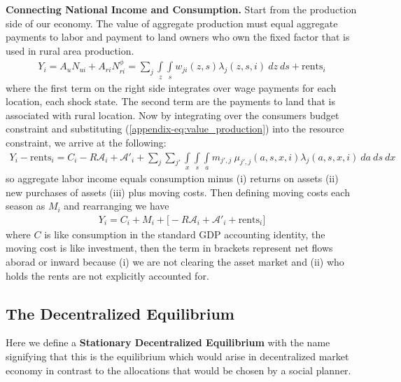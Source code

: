 \documentclass[12pt,pdftex]{article}
\begin{document}
\textbf{Connecting National Income and Consumption.} Start from the production side of our economy. The value of aggregate production must equal aggregate payments to labor and payment to land owners who own the fixed factor that is used in rural area production.
\begin{align}
Y_i = A_u N_{ui} + A_{ri}N_{ri}^{\phi} = \sum_{j} \int\limits_{z} \int\limits_{s} w_{ji}(z, s)\lambda_j(z, s,i)\ dz \ ds + \mbox{rents}_{i}
\label{appendix-eq:value_production}
\end{align}
where the first term on the right side integrates over wage payments for each location, each shock state. The second term are the payments to land that is associated with rural location. Now by integrating over the consumers budget constraint and substituting (\ref{appendix-eq:value_production}) into the resource constraint, we arrive at the following:
\begin{align}
Y_i - \mbox{rents}_{i} = C_i - R\mathcal{A}_i +  \mathcal{A'}_i  + \sum_{j}\sum_{j'} \int\limits_{x} \int\limits_{s} \int\limits_{a} m_{j',j} \ \mu_{j',j}(a, s, x, i) \lambda_j(a, s, x, i) \ da \ ds \ dx
\label{appendix-eq:expenditure_side_gdp}
\end{align}
so aggregate labor income equals consumption minus (i) returns on assets (ii) new purchases of assets (iii) plus moving costs. Then defining moving costs each season as $M_i$ and rearranging we have
\begin{align}
Y_i = C_i  + M_i + \bigg[-R\mathcal{A}_i +  \mathcal{A'}_i + \mbox{rents}_{i}\bigg]
\label{appendix-eq:income_side_gdp2}
\end{align}
where $C$ is like consumption in the standard GDP accounting identity, the moving cost is like investment, then the term in brackets represent net flows aborad or inward because (i) we are not clearing the asset market and (ii) who holds the rents are not explicitly accounted for.

\subsection{The Decentralized Equilibrium}

Here we define a \textbf{Stationary Decentralized Equilibrium} with the name signifying that this is the equilibrium which would arise in  decentralized market economy in contrast to the allocations that would be chosen by a social planner.
\end{document}

